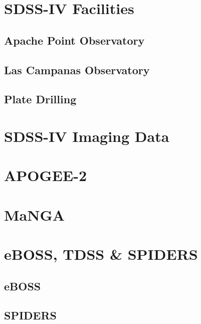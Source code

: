 \documentclass[twocolumn,tighten]{aastex61}
\begin{document}
\section{SDSS-IV Facilities}
\label{sec:facilities}


\subsection{Apache Point Observatory}
\label{sec:apo}


\subsection{Las Campanas Observatory}
\label{sec:lco}


\subsection{Plate Drilling}
\label{sec:plates}


\section{SDSS-IV Imaging Data}
\label{sec:imaging}


\section{APOGEE-2}
\label{sec:apogee2}


\section{MaNGA}
\label{sec:manga}


\section{eBOSS, TDSS \& SPIDERS}
\label{sec:ets}


\subsection{eBOSS}
\label{sec:eboss}


\subsection{SPIDERS}
\label{sec:spiders}

\end{document}
